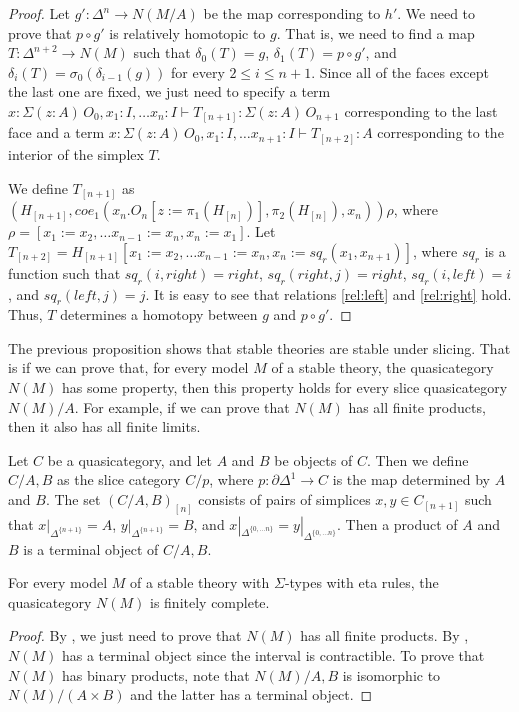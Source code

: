 \documentclass[reqno]{amsart}
\theoremstyle{definition}
\theoremstyle{remark}
\newcommand{\repl}{:=}
\numberwithin{figure}{section}
\begin{document}
\begin{proof}
Let $g' : \Delta^n \to N(M/A)$ be the map corresponding to $h'$.
We need to prove that $p \circ g'$ is relatively homotopic to $g$.
That is, we need to find a map $T : \Delta^{n+2} \to N(M)$ such that $\delta_0(T) = g$, $\delta_1(T) = p \circ g'$,
and $\delta_i(T) = \sigma_0(\delta_{i-1}(g))$ for every $2 \leq i \leq n+1$.
Since all of the faces except the last one are fixed, we just need to specify a term $x : \Sigma (z : A)\,O_0, x_1 : I, \ldots x_n : I \vdash T_{[n+1]} : \Sigma (z : A)\,O_{n+1}$
corresponding to the last face and a term $x : \Sigma (z : A)\,O_0, x_1 : I, \ldots x_{n+1} : I \vdash T_{[n+2]} : A$ corresponding to the interior of the simplex $T$.

We define $T_{[n+1]}$ as $(H_{[n+1]}, coe_1(x_n.O_n[z \repl \pi_1(H_{[n]})], \pi_2(H_{[n]}), x_n))\rho$, where $\rho = [x_1 \repl x_2, \ldots x_{n-1} \repl x_n, x_n \repl x_1]$.
Let $T_{[n+2]} = H_{[n+1]}[x_1 \repl x_2, \ldots x_{n-1} \repl x_n, x_n \repl sq_r(x_1, x_{n+1})]$,
where $sq_r$ is a function such that $sq_r(i,right) = right$, $sq_r(right,j) = right$, $sq_r(i,left) = i$, and $sq_r(left,j) = j$.
It is easy to see that relations \eqref{rel:left} and \eqref{rel:right} hold.
Thus, $T$ determines a homotopy between $g$ and $p \circ g'$.
\end{proof}

The previous proposition shows that stable theories are stable under slicing.
That is if we can prove that, for every model $M$ of a stable theory, the quasicategory $N(M)$ has some property,
then this property holds for every slice quasicategory $N(M)/A$.
For example, if we can prove that $N(M)$ has all finite products, then it also has all finite limits.

Let $C$ be a quasicategory, and let $A$ and $B$ be objects of $C$.
Then we define $C/A,B$ as the slice category $C/p$, where $p : \partial \Delta^1 \to C$ is the map determined by $A$ and $B$.
The set $(C/A,B)_{[n]}$ consists of pairs of simplices $x,y \in C_{[n+1]}$ such that
$x|_{\Delta^{\{n+1\}}} = A$, $y|_{\Delta^{\{n+1\}}} = B$, and $x|_{\Delta^{\{0, \ldots n\}}} = y|_{\Delta^{\{0, \ldots n\}}}$.
Then a product of $A$ and $B$ is a terminal object of $C/A,B$.

\begin{prop}
For every model $M$ of a stable theory with $\Sigma$-types with eta rules, the quasicategory $N(M)$ is finitely complete.
\end{prop}
\begin{proof}
By , we just need to prove that $N(M)$ has all finite products.
By , $N(M)$ has a terminal object since the interval is contractible.
To prove that $N(M)$ has binary products, note that $N(M)/A,B$ is isomorphic to $N(M)/(A \times B)$ and the latter has a terminal object.
\end{proof}



\end{document}
